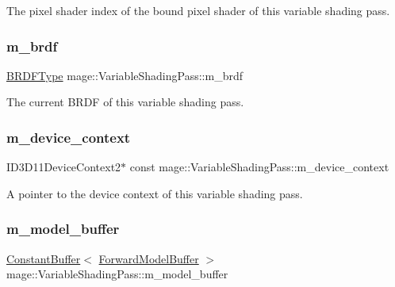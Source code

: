 The pixel shader index of the bound pixel shader of this variable shading pass. \hypertarget{classmage_1_1_variable_shading_pass_ac6147f2068fd7727fe2d78584ff68767}{}\label{classmage_1_1_variable_shading_pass_ac6147f2068fd7727fe2d78584ff68767} 
\subsubsection{\texorpdfstring{m\+\_\+brdf}{m\_brdf}}
{\footnotesize\ttfamily \hyperlink{namespacemage_ae7a7a03a7b34d7e2689689bb8295cd38}{B\+R\+D\+F\+Type} mage\+::\+Variable\+Shading\+Pass\+::m\+\_\+brdf\hspace{0.3cm}{\ttfamily [private]}}

The current B\+R\+DF of this variable shading pass. \hypertarget{classmage_1_1_variable_shading_pass_afff786ea38b64ba069866fdd6b525ba7}{}\label{classmage_1_1_variable_shading_pass_afff786ea38b64ba069866fdd6b525ba7} 
\subsubsection{\texorpdfstring{m\+\_\+device\+\_\+context}{m\_device\_context}}
{\footnotesize\ttfamily I\+D3\+D11\+Device\+Context2$\ast$ const mage\+::\+Variable\+Shading\+Pass\+::m\+\_\+device\+\_\+context\hspace{0.3cm}{\ttfamily [private]}}

A pointer to the device context of this variable shading pass. \hypertarget{classmage_1_1_variable_shading_pass_a563f4a9d0b9c4512f63daaec19ee4750}{}\label{classmage_1_1_variable_shading_pass_a563f4a9d0b9c4512f63daaec19ee4750} 
\subsubsection{\texorpdfstring{m\+\_\+model\+\_\+buffer}{m\_model\_buffer}}
{\footnotesize\ttfamily \hyperlink{structmage_1_1_constant_buffer}{Constant\+Buffer}$<$ \hyperlink{structmage_1_1_forward_model_buffer}{Forward\+Model\+Buffer} $>$ mage\+::\+Variable\+Shading\+Pass\+::m\+\_\+model\+\_\+buffer\hspace{0.3cm}{\ttfamily [private]}}

